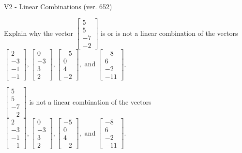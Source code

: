 \begin{exercise}
  \begin{exerciseTitle}V2 - Linear Combinations (ver. 652)\end{exerciseTitle}
  \begin{exerciseStatement}
    Explain why the vector \(\left[\begin{array}{c}
5 \\
5 \\
-7 \\
-2
\end{array}\right]\)  is or is not a linear 
	combination of the vectors \(\left[\begin{array}{c}
2 \\
-3 \\
-1 \\
-1
\end{array}\right] , \left[\begin{array}{c}
0 \\
-3 \\
3 \\
2
\end{array}\right] , \left[\begin{array}{c}
-5 \\
0 \\
4 \\
-2
\end{array}\right] , \text{ and } \left[\begin{array}{c}
-8 \\
6 \\
-2 \\
-11
\end{array}\right]\).
	


  \end{exerciseStatement}
  \begin{exerciseAnswer}
   \(\left[\begin{array}{c}
5 \\
5 \\
-7 \\
-2
\end{array}\right]\) 
  	 is not  
	a linear combination of the vectors \(\left[\begin{array}{c}
2 \\
-3 \\
-1 \\
-1
\end{array}\right] , \left[\begin{array}{c}
0 \\
-3 \\
3 \\
2
\end{array}\right] , \left[\begin{array}{c}
-5 \\
0 \\
4 \\
-2
\end{array}\right] , \text{ and } \left[\begin{array}{c}
-8 \\
6 \\
-2 \\
-11
\end{array}\right]\).


\end{exerciseAnswer}
\end{exercise}
